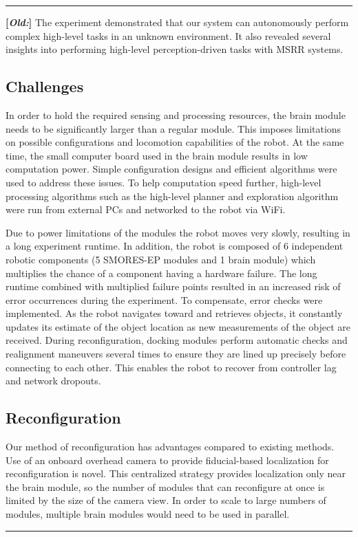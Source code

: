 \documentclass[conference]{IEEEtran}
\newcommand{\separator}{ \noindent \rule{\columnwidth}{1pt} }
\newenvironment{old}{\color{Maroon} \separator \textbf{[\textit{Old:}]} }{\ignorespacesafterend \separator}
\begin{document}
\begin{old}
The experiment demonstrated that our system can autonomously perform complex high-level tasks in an unknown environment. It also revealed several insights into performing high-level perception-driven tasks with MSRR systems.
\subsection{Challenges}

In order to hold the required sensing and processing resources, the brain module needs to be significantly larger than a regular module. This imposes limitations on possible configurations and locomotion capabilities of the robot. At the same time, the small computer board used in the brain module results in low computation power. Simple configuration designs and efficient algorithms were used to address these issues. To help computation speed further, high-level processing algorithms such as the high-level planner and exploration algorithm were run from external PCs and networked to the robot via WiFi.

Due to power limitations of the modules the robot moves very slowly, resulting in a long experiment runtime. In addition, the robot is composed of 6 independent robotic components (5 SMORES-EP modules and 1 brain module) which multiplies the chance of a component having a hardware failure. The long runtime combined with multiplied failure points resulted in an increased risk of error occurrences during the experiment. To compensate, error checks were implemented. As the robot navigates toward and retrieves objects, it constantly updates its estimate of the object location as new measurements of the object are received. During reconfiguration, docking modules perform automatic checks and realignment maneuvers several times to ensure they are lined up precisely before connecting to each other. This enables the robot to recover from controller lag and network dropouts.

%
\subsection{Reconfiguration}
Our method of reconfiguration has advantages compared to existing methods.  Use of an onboard overhead camera to provide fiducial-based localization for reconfiguration is novel.  This centralized strategy provides localization only near the brain module, so the number of modules that can reconfigure at once is limited by the size of the camera view. In order to scale to large numbers of modules, multiple brain modules would need to be used in parallel.


\end{old}
\end{document}
